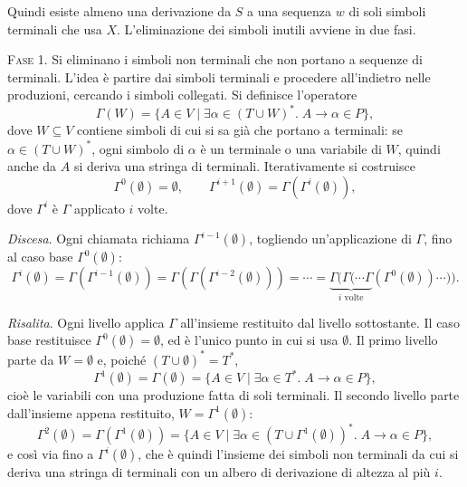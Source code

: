 \documentclass[a4paper, 11pt, oneside]{book}
\theoremstyle{formale}
\begin{document}
    Quindi esiste almeno una derivazione da $S$ a una sequenza $w$ di soli simboli
    terminali che usa $X$. L'eliminazione dei simboli inutili avviene in due fasi.

    \textsc{Fase 1}. Si eliminano i simboli non terminali che non portano a sequenze di
    terminali. L'idea \`e partire dai simboli terminali e procedere all'indietro nelle
    produzioni, cercando i simboli collegati. Si definisce l'operatore
    \begin{equation*}
        \Gamma(W) = \{A \in V \mid \exists \alpha \in (T \cup W)^*.\;
        A \to \alpha \in P\},
    \end{equation*}
    dove $W \subseteq V$ contiene simboli di cui si sa gi\`a che portano a terminali: se
    $\alpha \in (T \cup W)^*$, ogni simbolo di $\alpha$ \`e un terminale o una variabile
    di $W$, quindi anche da $A$ si deriva una stringa di terminali. Iterativamente si
    costruisce
    \begin{equation*}
        \Gamma^0(\emptyset) = \emptyset, \qquad
        \Gamma^{i+1}(\emptyset) = \Gamma(\Gamma^i(\emptyset)),
    \end{equation*}
    dove $\Gamma^i$ \`e $\Gamma$ applicato $i$ volte.

    \textit{Discesa}. Ogni chiamata richiama $\Gamma^{i-1}(\emptyset)$, togliendo
    un'applicazione di $\Gamma$, fino al caso base $\Gamma^0(\emptyset)$:
    \begin{equation*}
        \Gamma^i(\emptyset)
        = \Gamma(\Gamma^{i-1}(\emptyset))
        = \Gamma(\Gamma(\Gamma^{i-2}(\emptyset)))
        = \cdots
        = \underbrace{\Gamma(\Gamma(\cdots \Gamma}_{i \text{ volte}}
            (\Gamma^0(\emptyset)) \cdots)).
    \end{equation*}

    \textit{Risalita}. Ogni livello applica $\Gamma$ all'insieme restituito dal livello
    sottostante. Il caso base restituisce $\Gamma^0(\emptyset) = \emptyset$, ed \`e
    l'unico punto in cui si usa $\emptyset$. Il primo livello parte da $W = \emptyset$
    e, poich\'e $(T \cup \emptyset)^* = T^*$,
    \begin{equation*}
        \Gamma^1(\emptyset) = \Gamma(\emptyset)
        = \{A \in V \mid \exists \alpha \in T^*.\; A \to \alpha \in P\},
    \end{equation*}
    cio\`e le variabili con una produzione fatta di soli terminali. Il secondo livello
    parte dall'insieme appena restituito, $W = \Gamma^1(\emptyset)$:
    \begin{equation*}
        \Gamma^2(\emptyset) = \Gamma(\Gamma^1(\emptyset))
        = \{A \in V \mid \exists \alpha \in (T \cup \Gamma^1(\emptyset))^*.\;
        A \to \alpha \in P\},
    \end{equation*}
    e cos\`i via fino a $\Gamma^i(\emptyset)$, che \`e quindi l'insieme dei simboli non
    terminali da cui si deriva una stringa di terminali con un albero di derivazione di
    altezza al pi\`u $i$.
\end{document}
